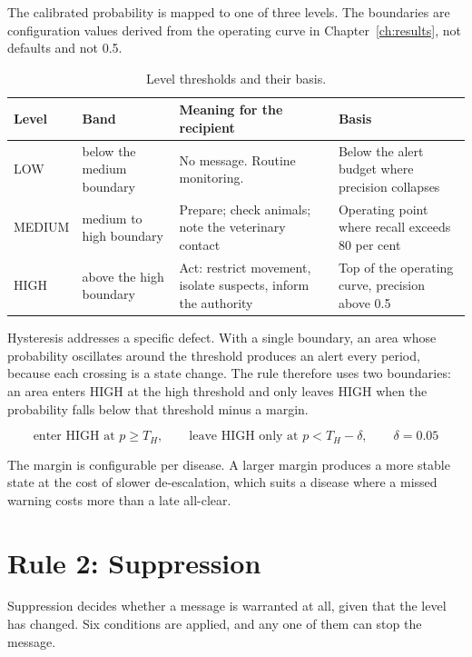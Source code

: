 \documentclass[10pt,openany]{report}
\begin{document}
The calibrated probability is mapped to one of three levels. The boundaries are configuration
values derived from the operating curve in Chapter~\ref{ch:results}, not defaults and not 0.5.

\begin{table}[htbp]
\centering
\caption{Level thresholds and their basis.}
\label{tab:thresholds}
\small
\begin{tabular}{@{}p{1.8cm}p{2.8cm}p{5.0cm}p{3.2cm}@{}}
\toprule
\textbf{Level} & \textbf{Band} & \textbf{Meaning for the recipient} & \textbf{Basis} \\
\midrule
LOW & below the medium boundary & No message. Routine monitoring. & Below the alert budget where precision collapses \\
MEDIUM & medium to high boundary & Prepare; check animals; note the veterinary contact & Operating point where recall exceeds 80 per cent \\
HIGH & above the high boundary & Act: restrict movement, isolate suspects, inform the authority & Top of the operating curve, precision above 0.5 \\
\bottomrule
\end{tabular}
\end{table}

Hysteresis addresses a specific defect. With a single boundary, an area whose probability oscillates
around the threshold produces an alert every period, because each crossing is a state change. The
rule therefore uses two boundaries: an area enters HIGH at the high threshold and only leaves HIGH
when the probability falls below that threshold minus a margin.

\[
\text{enter HIGH at } p \ge T_H, \qquad
\text{leave HIGH only at } p < T_H - \delta, \qquad \delta = 0.05
\]

The margin is configurable per disease. A larger margin produces a more stable state at the cost of
slower de-escalation, which suits a disease where a missed warning costs more than a late
all-clear.

\section{Rule 2: Suppression}

Suppression decides whether a message is warranted at all, given that the level has changed. Six
conditions are applied, and any one of them can stop the message.
\end{document}
